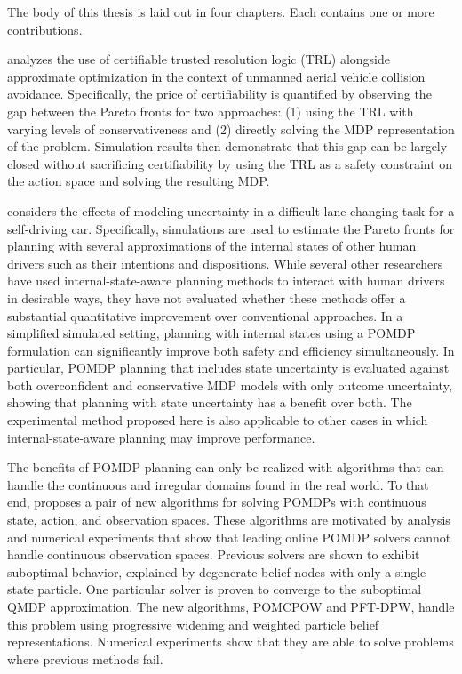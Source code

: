 The body of this thesis is laid out in four chapters.
Each contains one or more contributions.

 analyzes the use of certifiable trusted resolution logic (TRL) alongside approximate optimization in the context of unmanned aerial vehicle collision avoidance.
Specifically, the price of certifiability is quantified by observing the gap between the Pareto fronts for two approaches: (1) using the TRL with varying levels of conservativeness and (2) directly solving the MDP representation of the problem.
Simulation results then demonstrate that this gap can be largely closed without sacrificing certifiability by using the TRL as a safety constraint on the action space and solving the resulting MDP.

 considers the effects of modeling uncertainty in a difficult lane changing task for a self-driving car.
Specifically, simulations are used to estimate the Pareto fronts for planning with several approximations of the internal states of other human drivers such as their intentions and dispositions.
While several other researchers have used internal-state-aware planning methods to interact with human drivers in desirable ways, they have not evaluated whether these methods offer a substantial quantitative improvement over conventional approaches.
In a simplified simulated setting, planning with internal states using a POMDP formulation can significantly improve both safety and efficiency simultaneously.
In particular, POMDP planning that includes state uncertainty is evaluated against both overconfident and conservative MDP models with only outcome uncertainty, showing that planning with state uncertainty has a benefit over both.
The experimental method proposed here is also applicable to other cases in which internal-state-aware planning may improve performance.

The benefits of POMDP planning can only be realized with algorithms that can handle the continuous and irregular domains found in the real world.
To that end,  proposes a pair of new algorithms for solving POMDPs with continuous state, action, and observation spaces.
These algorithms are motivated by analysis and numerical experiments that show that leading online POMDP solvers cannot handle continuous observation spaces.
Previous solvers are shown to exhibit suboptimal behavior, explained by degenerate belief nodes with only a single state particle.
One particular solver is proven to converge to the suboptimal QMDP approximation.
The new algorithms, POMCPOW and PFT-DPW, handle this problem using progressive widening and weighted particle belief representations.
Numerical experiments show that they are able to solve problems where previous methods fail.

